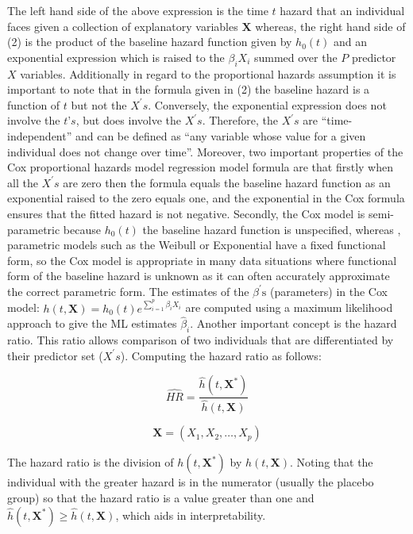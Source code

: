 \documentclass[12pt,twoside]{reedthesis}
\begin{document}
The left hand side of the above expression is the time \(\textit{t}\) hazard that an individual faces given a collection of explanatory variables \(\mathbf{X}\) whereas, the right hand side of (2) is the product of the baseline hazard function given by \(\mathit{{h_{0}(t)}}\) and an exponential expression which is raised to the \(\mathit{\beta_{i} X_{i}}\) summed over the \(\textit{P}\) predictor \(\mathit{X}\) variables.
Additionally in regard to the proportional hazards assumption it is important to note that in the formula given in (2) the baseline hazard is a function of \(\textit{t}\) but not the \(X^{\prime} s\). Conversely, the exponential expression does not involve the \(\textit{t's}\), but does involve the \(X^{\prime} s\). Therefore, the \(X^{\prime} s\) are ``time-independent'' and can be defined as ``any variable whose value for a given individual does not change over time''. Moreover, two important properties of the Cox proportional hazards model regression model formula are that firstly when all the \(X^{\prime} s\) are zero then the formula equals the baseline hazard function as an exponential raised to the zero equals one, and the exponential in the Cox formula ensures that the fitted hazard is not negative.
Secondly, the Cox model is semi-parametric because \(\mathit{{h_{0}(t)}}\) the baseline hazard function is unspecified, whereas , parametric models such as the Weibull or Exponential have a fixed functional form, so the Cox model is appropriate in many data situations where functional form of the baseline hazard is unknown as it can often accurately approximate the correct parametric form.
The estimates of the \(\beta^{\prime} \mathrm{s}\) (parameters) in the Cox model: \(h(t, \mathbf{X})=h_{0}(t) e^{\sum_{i=1}^{p} \beta_{i} X_{i}}\) are computed using a maximum likelihood approach to give the ML estimates \(\hat{\beta}_{i}\).
Another important concept is the hazard ratio. This ratio allows comparison of two individuals that are differentiated by their predictor set (\(X^{\prime} s\)). Computing the hazard ratio as follows:

\[\widehat{H R}=\frac{\hat{h}\left(t, \mathbf{X}^{*}\right)}{\hat{h}(t, \mathbf{X})}\]

\[\mathbf{X}=\left(X_{1}, X_{2}, \ldots, X_{p}\right)\]

The hazard ratio is the division of \(h\left(t, \mathbf{X}^{*}\right)\) by \(h(t, \mathbf{X})\). Noting that the individual with the greater hazard is in the numerator (usually the placebo group) so that the hazard ratio is a value greater than one and \(\hat{h}\left(t, \mathbf{X}^{*}\right) \geq \hat{h}(t, \mathbf{X})\), which aids in interpretability.
\end{document}

